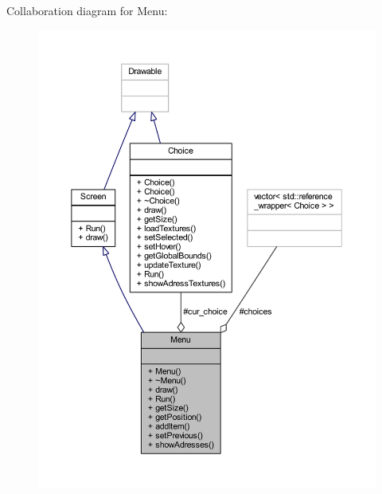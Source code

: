 Collaboration diagram for Menu\+:
\nopagebreak
\begin{figure}[H]
\begin{center}
\leavevmode
\includegraphics[width=350pt]{class_menu__coll__graph}
\end{center}
\end{figure}
